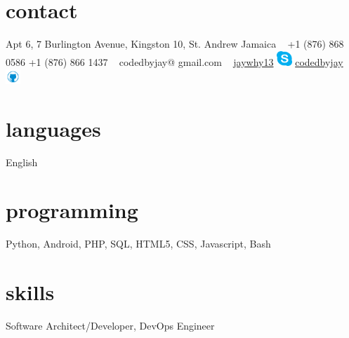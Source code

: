 \documentclass[]{cv-style}          %
\begin{document}

\lastupdated


\begin{aside}
%
\section{contact}
Apt 6, 
7 Burlington Avenue,
Kingston 10,
St. Andrew
Jamaica
~
+1 (876) 868 0586
+1 (876) 866 1437
~
codedbyjay@
gmail.com
~
\href {skype://jaywhy13}{jaywhy13} \includegraphics[height=16pt]{img/skype.png}
\href {http://github.com/codedbyjay}{codedbyjay} \includegraphics[height=16pt]{img/github.png}
%
\section{languages}
English
%
\section{programming}
Python, Android, PHP, SQL, HTML5, CSS, Javascript, Bash
%
\end{aside}


\section{skills}
  \vspace{-0.2cm}

Software Architect/Developer, DevOps Engineer

\end{document}
